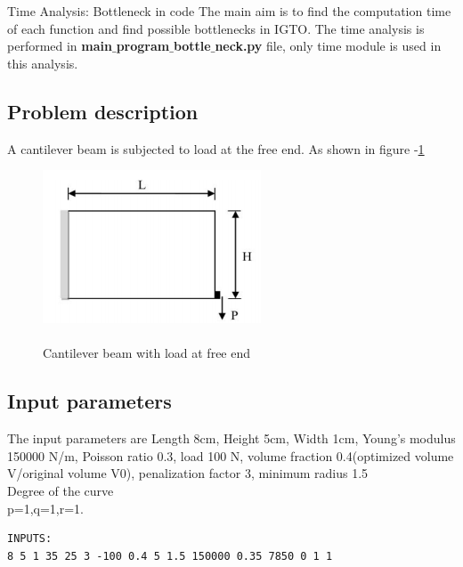 \documentclass[a4paper,12pt,times]{article}
\begin{document}
\begin{section}{Time Analysis: Bottleneck in code}
The main aim is to find the computation time of each function and find possible bottlenecks in IGTO. The time analysis is performed in \textbf{main$\_ $program$\_ $bottle$\_$neck.py} file, only time module is used in this analysis.\\

\subsection{Problem description}
A cantilever beam is subjected to load at the free end. As shown in figure -\ref{fig:problem-1}
\begin{figure}[H]
	\begin{center}
		\includegraphics[scale=1.75]{Problem-1.png} 
		\caption{\\Cantilever beam with load at free end}\label{fig:problem-1}
	\end{center}	
\end{figure}

\subsection{Input parameters}
The input parameters are Length 8cm, Height 5cm, Width 1cm, Young's modulus 150000 N/m, Poisson ratio 0.3, load 100 N, volume fraction 0.4(optimized volume V/original volume V0), penalization factor 3, minimum radius 1.5 \\ 
Degree of the curve\\
p=1,q=1,r=1.

\begin{lstlisting}
INPUTS:
8 5 1 35 25 3 -100 0.4 5 1.5 150000 0.35 7850 0 1 1
\end{lstlisting}


\end{section}
\end{document}

